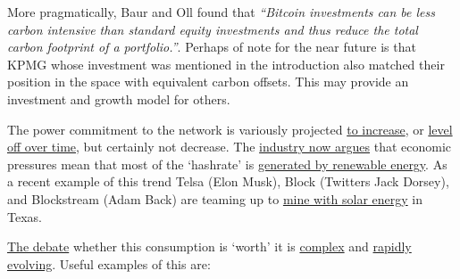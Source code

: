 More pragmatically, Baur and Oll found that \textit{``Bitcoin investments can be less carbon intensive than standard equity investments and thus reduce the total carbon footprint of a portfolio.''}\cite{baur2021bitcoin}. Perhaps of note for the near future is that KPMG whose investment was mentioned in the introduction also matched their position in the space with equivalent  carbon offsets. This may provide an investment and growth model for others.\par
The power commitment to the network is variously projected \href{https://www.nature.com/articles/s41558-018-0321-8}{to increase}, or \href{https://assets.website-files.com/614e11526f6630959fc98679/616df63a27a7ec339f5e6a80_NYDIG-BitcoinNetZero_SML.pdf}{level off over time}, but certainly not decrease. The \href{https://www.forbes.com/sites/martinrivers/2022/04/03/is-bitcoin-really-that-bad-for-the-environment/?sh=6a3203427143}{industry now argues} that economic pressures mean that most of the `hashrate' is \href{https://bitcoinminingcouncil.com/q4-bitcoin-mining-council-survey-confirms-sustainable-power-mix-and-technological-efficiency/}{generated by renewable energy}\cite{blandin20203rd}. As a recent example of this trend Telsa (Elon Musk), Block (Twitters Jack Dorsey), and Blockstream (Adam Back) are teaming up to \href{https://www.cnbc.com/2022/04/08/tesla-block-blockstream-to-mine-bitcoin-off-solar-power-in-texas.html}{mine with solar energy} in Texas.\par 
\par%
\href{https://www.youtube.com/watch?v=6LP8G-oZnEs}{The debate} whether this consumption is `worth' it is \href{https://www.utilitydive.com/news/bitcoin-mining-as-a-grid-resource-its-complicated/617896/}{complex} and \href{https://www.aei.org/technology-and-innovation/no-hearing-on-bitcoins-energy-use-is-complete-without-nic-carter/}{rapidly evolving}. Useful examples of this are:
